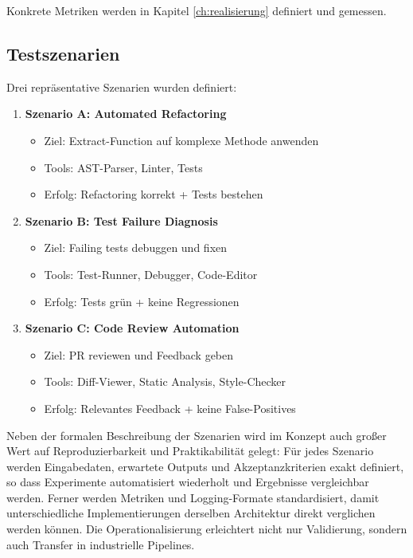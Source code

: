 Konkrete Metriken werden in Kapitel \ref{ch:realisierung} definiert und gemessen.

\subsection{Testszenarien}

Drei repräsentative Szenarien wurden definiert:

\begin{enumerate}
  \item \textbf{Szenario A: Automated Refactoring}
    \begin{sloppypar}
    \begin{itemize}
      \item Ziel: Extract-Function auf komplexe Methode anwenden
      \item Tools: AST-Parser, Linter, Tests
      \item Erfolg: Refactoring korrekt + Tests bestehen
    \end{itemize}
    \end{sloppypar}
  
  \item \textbf{Szenario B: Test Failure Diagnosis}
    \begin{sloppypar}
    \begin{itemize}
      \item Ziel: Failing tests debuggen und fixen
      \item Tools: Test-Runner, Debugger, Code-Editor
      \item Erfolg: Tests grün + keine Regressionen
    \end{itemize}
    \end{sloppypar}
  
  \item \textbf{Szenario C: Code Review Automation}
    \begin{sloppypar}
    \begin{itemize}
      \item Ziel: PR reviewen und Feedback geben
      \item Tools: Diff-Viewer, Static Analysis, Style-Checker
      \item Erfolg: Relevantes Feedback + keine False-Positives
    \end{itemize}
    \end{sloppypar}
\end{enumerate}

Neben der formalen Beschreibung der Szenarien wird im Konzept auch großer Wert auf Reproduzierbarkeit und Praktikabilität gelegt: Für jedes Szenario werden Eingabedaten, erwartete Outputs und Akzeptanzkriterien exakt definiert, so dass Experimente automatisiert wiederholt und Ergebnisse vergleichbar werden. Ferner werden Metriken und Logging-Formate standardisiert, damit unterschiedliche Implementierungen derselben Architektur direkt verglichen werden können. Die Operationalisierung erleichtert nicht nur Validierung, sondern auch Transfer in industrielle Pipelines.

